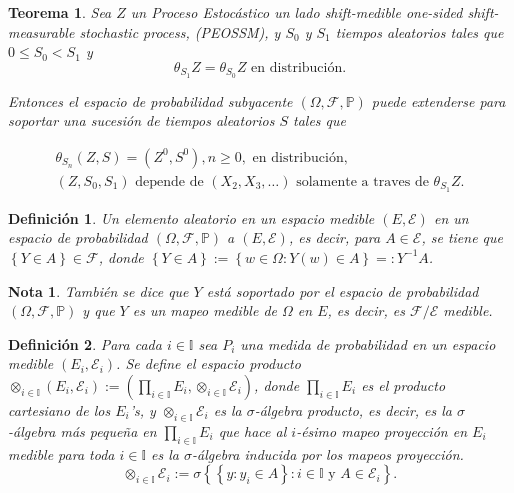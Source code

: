 \documentclass{article}
\newtheorem{Def}{Definición}
\newtheorem{Teo}{Teorema}
\newtheorem{Note}{Nota}
\newcommand{\prob}{\mathbb{P}}
\begin{document}
\begin{Teo}
Sea $Z$ un Proceso Estoc\'astico un lado shift-medible \textit{one-sided shift-measurable stochastic process}, (PEOSSM),
y $S_{0}$ y $S_{1}$ tiempos aleatorios tales que $0\leq S_{0}<S_{1}$ y
\begin{equation}
\theta_{S_{1}}Z=\theta_{S_{0}}Z\textrm{ en distribuci\'on}.
\end{equation}

Entonces el espacio de probabilidad subyacente $\left(\Omega,\mathcal{F},\prob\right)$ puede extenderse para soportar una sucesi\'on de tiempos aleatorios $S$ tales que

\begin{eqnarray}
\theta_{S_{n}}\left(Z,S\right)=\left(Z^{0},S^{0}\right),n\geq0,\textrm{ en distribuci\'on},\\
\left(Z,S_{0},S_{1}\right)\textrm{ depende de }\left(X_{2},X_{3},\ldots\right)\textrm{ solamente a traves de }\theta_{S_{1}}Z.
\end{eqnarray}
\end{Teo}


\begin{Def}
Un elemento aleatorio en un espacio medible $\left(E,\mathcal{E}\right)$ en un espacio de probabilidad $\left(\Omega,\mathcal{F},\prob\right)$ a $\left(E,\mathcal{E}\right)$, es decir,
para $A\in \mathcal{E}$,  se tiene que $\left\{Y\in A\right\}\in\mathcal{F}$, donde $\left\{Y\in A\right\}:=\left\{w\in\Omega:Y\left(w\right)\in A\right\}=:Y^{-1}A$.
\end{Def}

\begin{Note}
Tambi\'en se dice que $Y$ est\'a soportado por el espacio de probabilidad $\left(\Omega,\mathcal{F},\prob\right)$ y que $Y$ es un mapeo medible de $\Omega$ en $E$, es decir, es $\mathcal{F}/\mathcal{E}$ medible.
\end{Note}

\begin{Def}
Para cada $i\in \mathbb{I}$ sea $P_{i}$ una medida de probabilidad en un espacio medible $\left(E_{i},\mathcal{E}_{i}\right)$. Se define el espacio producto
$\otimes_{i\in\mathbb{I}}\left(E_{i},\mathcal{E}_{i}\right):=\left(\prod_{i\in\mathbb{I}}E_{i},\otimes_{i\in\mathbb{I}}\mathcal{E}_{i}\right)$, donde $\prod_{i\in\mathbb{I}}E_{i}$ es el producto cartesiano de los $E_{i}$'s, y $\otimes_{i\in\mathbb{I}}\mathcal{E}_{i}$ es la $\sigma$-\'algebra producto, es decir, es la $\sigma$-\'algebra m\'as peque\~na en $\prod_{i\in\mathbb{I}}E_{i}$ que hace al $i$-\'esimo mapeo proyecci\'on en $E_{i}$ medible para toda $i\in\mathbb{I}$ es la $\sigma$-\'algebra inducida por los mapeos proyecci\'on. $$\otimes_{i\in\mathbb{I}}\mathcal{E}_{i}:=\sigma\left\{\left\{y:y_{i}\in A\right\}:i\in\mathbb{I}\textrm{ y }A\in\mathcal{E}_{i}\right\}.$$
\end{Def}
\end{document}
